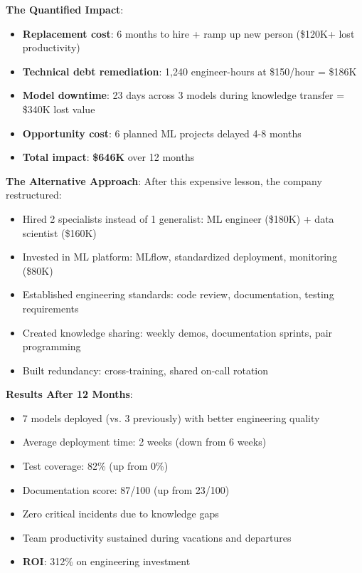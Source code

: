 \textbf{The Quantified Impact}:
\begin{itemize}
    \item \textbf{Replacement cost}: 6 months to hire + ramp up new person (\$120K+ lost productivity)
    \item \textbf{Technical debt remediation}: 1,240 engineer-hours at \$150/hour = \$186K
    \item \textbf{Model downtime}: 23 days across 3 models during knowledge transfer = \$340K lost value
    \item \textbf{Opportunity cost}: 6 planned ML projects delayed 4-8 months
    \item \textbf{Total impact}: \textbf{\$646K} over 12 months
\end{itemize}

\textbf{The Alternative Approach}: After this expensive lesson, the company restructured:

\begin{itemize}
    \item Hired 2 specialists instead of 1 generalist: ML engineer (\$180K) + data scientist (\$160K)
    \item Invested in ML platform: MLflow, standardized deployment, monitoring (\$80K)
    \item Established engineering standards: code review, documentation, testing requirements
    \item Created knowledge sharing: weekly demos, documentation sprints, pair programming
    \item Built redundancy: cross-training, shared on-call rotation
\end{itemize}

\textbf{Results After 12 Months}:
\begin{itemize}
    \item 7 models deployed (vs. 3 previously) with better engineering quality
    \item Average deployment time: 2 weeks (down from 6 weeks)
    \item Test coverage: 82\% (up from 0\%)
    \item Documentation score: 87/100 (up from 23/100)
    \item Zero critical incidents due to knowledge gaps
    \item Team productivity sustained during vacations and departures
    \item \textbf{ROI}: 312\% on engineering investment
\end{itemize}

